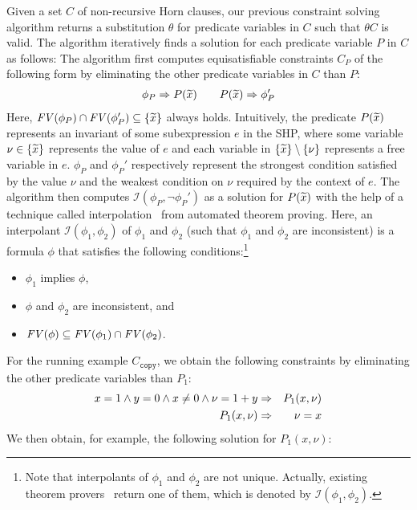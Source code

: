 Given a set \(C\) of non-recursive Horn clauses, our previous constraint
solving algorithm returns a substitution \(\theta\) for predicate
variables in \(C\) such that \(\theta C\) is valid.
The algorithm iteratively finds a solution for each predicate variable 
\(P\) in \(C\) as follows:  The algorithm first computes equisatisfiable 
constraints \(C_P\) of the following form by eliminating the other 
predicate variables in \(C\) than \(P\):
\begin{eqnarray*}
\phi_{P} \Rightarrow P(\widetilde{x}) \qquad
P(\widetilde{x}) \Rightarrow \phi_{P}'
\end{eqnarray*}
Here, \(\mathit{FV}({\phi_{P}}) \cap \mathit{FV}({\phi_{P}'}) \subseteq \{{\widetilde{x}}\}\) 
always holds.  Intuitively, the predicate \(P(\widetilde{x})\) represents an 
invariant of some subexpression \(e\) in the SHP, where some variable 
\(\nu \in\{{\widetilde{x}}\}\) represents the value of \(e\) and each variable 
in \(\{{\widetilde{x}}\} \setminus \{{\nu}\}\) represents a free variable in 
\(e\).  \(\phi_P\) and \(\phi_{P}'\) respectively represent the 
strongest condition satisfied by the value \(\nu\) and the weakest 
condition on \(\nu\) required by the context of \(e\).
%
The algorithm then computes \(\mathcal{I}(\phi_P,\neg \phi_P')\) as a 
solution for \(P(\widetilde{x})\) with the help of a technique called 
interpolation~\cite{McMillan2005,Beyer2008} from automated theorem 
proving.  Here, an interpolant \(\mathcal{I}(\phi_1,\phi_2)\) of 
\(\phi_1\) and \(\phi_2\) (such that \(\phi_1\) and \(\phi_2\) are 
inconsistent) is a formula \(\phi\) that satisfies the following 
conditions:\footnote{Note that interpolants of \(\phi_1\) and \(\phi_2\) 
are not unique.  Actually, existing theorem 
provers~\cite{McMillan2005,Beyer2008} return one of them, which is 
denoted by \(\mathcal{I}(\phi_1,\phi_2)\).}
\begin{itemize}
\item \(\phi_1\) implies \(\phi\),
\item \(\phi\) and \(\phi_2\) are inconsistent, and
\item \(\mathit{FV}({\phi}) \subseteq \mathit{FV}({\phi_1}) \cap \mathit{FV}({\phi_2})\).
\end{itemize}
%
For the running example \(C_{\texttt{copy}}\), we obtain the following 
constraints by eliminating the other predicate variables than \(P_1\):
\begin{eqnarray*}
x=1 \land y=0 \land x\neq0 \land \nu=1+y &\Rightarrow& P_1(x,\nu) \\
P_1(x,\nu) &\Rightarrow& \nu=x
\end{eqnarray*}
We then obtain, for example, the following solution for \(P_1(x,\nu)\):

